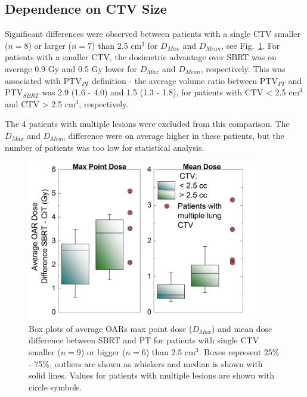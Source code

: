 \documentclass[type=dr, dr=rernat, acm$^3$entcolor=tud7b,colorbacktitle, bigchapter, openright, twoside, 12pt ]{tudthesis}
\begin{document}
\subsection{Dependence on CTV Size}

Significant differences were observed between patients with a single CTV smaller ($n=8$) or larger ($n=7$) than 2.5 cm$^{3}$ for $D_{Max}$ and $D_{Mean}$, see Fig.~\ref{Fig:OAR_boxplots}. For patients with a smaller CTV, the dosimetric advantage over SBRT was on average 0.9 Gy and 0.5 Gy lower for $D_{Max}$ and $D_{Mean}$, respectively. This was associated with PTV$_{PT}$ definition - the average volume ratio between PTV$_{PT}$ and PTV$_{SBRT}$ was 2.9 (1.6 - 4.0) and 1.5 (1.3 - 1.8), for patients with CTV < 2.5 cm$^{3}$ and CTV > 2.5 cm$^{3}$, respectively.

The 4 patients with multiple lesions were excluded from this comparison. The $D_{Max}$ and $D_{Mean}$ difference were on average higher in these patients, but the number of patients was too low for statistical analysis. 


\begin{figure}[H]
\begin{center}
\includegraphics[width=0.9\textwidth]{./Images/Figure4.png}
\caption{Box plots of average OARs max point dose ($D_{Max}$) and mean dose difference between SBRT and PT for patients with single CTV smaller ($n = 9$) or bigger ($n = 6$) than 2.5 cm$^{3}$. Boxes represent 25\% - 75\%, outliers are shown as whiskers and median is shown with solid lines. Values for patients with multiple lesions are shown with circle symbols.}
\label{Fig:OAR_boxplots}
\end{center}
\end{figure}
\end{document}

